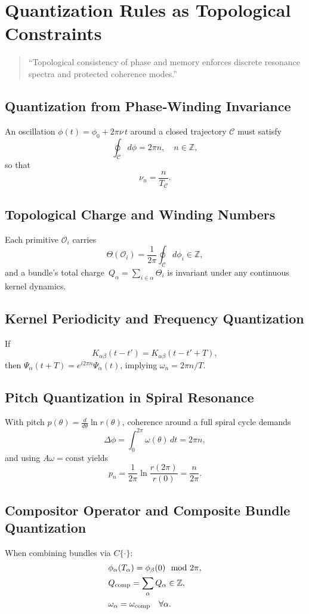 \section{Quantization Rules as Topological Constraints}

\begin{quote}
“Topological consistency of phase and memory enforces discrete resonance spectra and protected coherence modes.”
\end{quote}

\subsection{Quantization from Phase‐Winding Invariance}
An oscillation \(\phi(t)=\phi_{0}+2\pi\nu\,t\) around a closed trajectory \(\mathcal C\) must satisfy
\[
\oint_{\mathcal C}d\phi = 2\pi n,\quad n\in\mathbb Z,
\]
so that
\[
\nu_{n} = \frac{n}{T_{\mathcal C}}.
\]

\subsection{Topological Charge and Winding Numbers}
Each primitive \(\mathcal O_{i}\) carries
\[
\Theta(\mathcal O_{i})
= \frac{1}{2\pi}\oint_{\mathcal C}d\phi_{i}\in\mathbb Z,
\]
and a bundle’s total charge
\(\,Q_{\alpha}=\sum_{i\in\alpha}\Theta_{i}\)
is invariant under any continuous kernel dynamics.

\subsection{Kernel Periodicity and Frequency Quantization}
If
\[
K_{\alpha\beta}(t-t') = K_{\alpha\beta}(t-t'+T),
\]
then
\(\Psi_{\alpha}(t+T)=e^{i2\pi n}\Psi_{\alpha}(t)\),
implying
\(\omega_{n}=2\pi n/T\).

\subsection{Pitch Quantization in Spiral Resonance}
With pitch \(p(\theta)=\tfrac{d}{d\theta}\ln r(\theta)\), coherence around a full spiral cycle demands
\[
\Delta\phi
=\int_{0}^{2\pi}\omega(\theta)\,dt
=2\pi n,
\]
and using \(A\omega=\mathrm{const}\) yields
\[
p_{n}=\frac{1}{2\pi}\ln\frac{r(2\pi)}{r(0)}=\frac{n}{2\pi}.
\]

\subsection{Compositor Operator and Composite Bundle Quantization}
When combining bundles via \(C\{\cdot\}\):
\begin{align*}
&\phi_{\alpha}(T_{\alpha})=\phi_{\beta}(0)\mod 2\pi,\\
&Q_{\rm comp}=\sum_{\alpha}Q_{\alpha}\in\mathbb Z,\\
&\omega_{\alpha}=\omega_{\rm comp}\quad\forall\alpha.
\end{align*}

